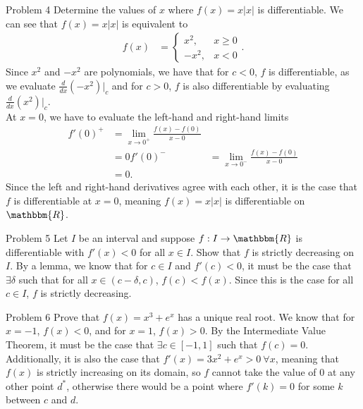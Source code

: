 \documentclass[8pt]{extarticle}
\newcommand{\R}{\mathbbm{R}}
\begin{document}
  \begin{problem}{Problem 4}
    Determine the values of $x$ where $f(x) = x|x|$ is differentiable.
    \tcblower
    We can see that $f(x) = x|x|$ is equivalent to
    \begin{align*}
      f(x) &= \begin{cases}
        x^2,&x \geq 0\\
        -x^2,&x < 0
      \end{cases}.
    \end{align*}
    Since $x^2$ and $-x^2$ are polynomials, we have that for $c < 0$, $f$ is differentiable, as we evaluate $\frac{d}{dx}(-x^2)\big\vert_{c}$ and for $c > 0$, $f$ is also differentiable by evaluating $\frac{d}{dx}(x^2)\big\vert_{c}$.\\

    At $x=0$, we have to evaluate the left-hand and right-hand limits
    \begin{align*}
      f'(0)^{+} &= \lim_{x\rightarrow 0^{+}}\frac{f(x)-f(0)}{x-0}\\
                &= 0
      f'(0)^{-} &= \lim_{x\rightarrow 0^{-}}\frac{f(x)-f(0)}{x-0}\\
                &= 0.
    \end{align*}
    Since the left and right-hand derivatives agree with each other, it is the case that $f$ is differentiable at $x=0$, meaning $f(x) = x|x|$ is differentiable on $\R$.
  \end{problem}
  \begin{problem}{Problem 5}
    Let $I$ be an interval and suppose $f: I\rightarrow \R$ is differentiable with $f'(x) < 0$ for all $x\in I$. Show that $f$ is strictly decreasing on $I$.
    \tcblower
    By a lemma, we know that for $c\in I$ and $f'(c) < 0$, it must be the case that $\exists \delta$ such that for all $x\in (c-\delta,c)$, $f(c) < f(x)$. Since this is the case for all $c\in I$, $f$ is strictly decreasing.
  \end{problem}
  \begin{problem}{Problem 6}
    Prove that $f(x) = x^3 + e^x$ has a unique real root.
    \tcblower
    We know that for $x = -1$, $f(x) < 0$, and for $x = 1$, $f(x) > 0$. By the Intermediate Value Theorem, it must be the case that $\exists c\in [-1,1]$ such that $f(c) =0$. Additionally, it is also the case that $f'(x) = 3x^2 + e^x > 0~\forall x$, meaning that $f(x)$ is strictly increasing on its domain, so $f$ cannot take the value of $0$ at any other point $d^{\ast}$, otherwise there would be a point where $f'(k) = 0$ for some $k$ between $c$ and $d$.
  \end{problem}
\end{document}
